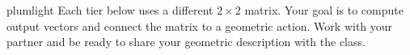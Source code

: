 \documentclass[10pt]{article}
\begin{document}
\namepartnerperiod

\vspace{0.1in}

\begin{scenariobox}{plumlight}
\small
Each tier below uses a different $2\times 2$ matrix.  Your goal is to compute output
vectors and connect the matrix to a geometric action.  Work with your partner and be
ready to share your geometric description with the class.
\end{scenariobox}

\vspace{0.1in}

\end{document}
